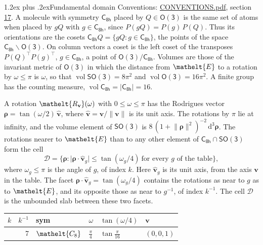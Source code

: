 \documentclass[10pt,a4paper]{article}
\makeatletter
\renewcommand\section{\@startsection{section}{1}{\z@}{-3ex plus -1ex minus -.2ex}%
  {1.2ex plus .2ex}{\normalfont\large\sffamily\bfseries\color{parttitle}}}
\numberwithin{equation}{section}
\newcommand{\eltfont}[1]{{\let\sigma\eltsigma\mathelt{#1}}}
\newcommand{\grp}[1]{\mathsf{#1}}
\newcommand{\cls}[1]{\eltfont{#1}}
\newcommand{\elt}[1]{\eltfont{#1}}
\newcommand{\dirvec}[3]{(#1, #2, #3)}
\newcommand{\unitaxis}{\hat{\mathbf{v}}}
\newcommand{\vv}{\mathbf{v}}
\newcommand{\diff}{\mathrm{d}}
\newcommand{\vol}{\operatorname{vol}}
\newcommand{\rodrigues}{\boldsymbol{\rho}}
\newcommand{\fcell}{\mathcal{D}}
\makeatother
\begin{document}
\section{Fundamental domain}\label{s:fundamental_domain}
Conventions: \href{../../CONVENTIONS.pdf}{CONVENTIONS.pdf}, section \href{../../CONVENTIONS.pdf\#conv.17}{17}.
\leavevmode\label{n:element.placement}A molecule with symmetry $\grp{C_{8h}}$ placed by $Q \in \grp{O(3)}$ is the same set of atoms when placed by $gQ$ with $g \in \grp{C_{8h}}$, since $P(gQ) = P(g)\,P(Q)$. \label{n:operator.cosets}Thus its orientations are the cosets $\grp{C_{8h}}Q = \{gQ : g \in \grp{C_{8h}}\}$, the points of the space $\grp{C_{8h}}\backslash\grp{O(3)}$. On column vectors a coset is the left coset of the transposes $P(Q)^{\top}P(g)^{\top}$, $g \in \grp{C_{8h}}$, a point of $\grp{O(3)}/\grp{C_{8h}}$.
\leavevmode\label{n:operator.volume}Volumes are those of the invariant metric of \href{O3.pdf}{$\grp{O(3)}$} in which the distance from $\elt{E}$ to a rotation by $\omega \le \pi$ is $\omega$, so that $\vol\grp{SO(3)} = 8\pi^2$ and $\vol\grp{O(3)} = 16\pi^2$. A finite group has the counting measure, $\vol\grp{C_{8h}} = |\grp{C_{8h}}| = 16$.

\leavevmode\label{n:vector.rodrigues}\label{n:vector.unitaxis}A rotation $\elt{R_{\vv}}(\omega)$ with $0 \le \omega \le \pi$ has the Rodrigues vector $\rodrigues = \tan(\omega/2)\,\unitaxis$, where $\unitaxis = \vv/\lVert\vv\rVert$ is its unit axis. The rotations by $\pi$ lie at infinity, and the volume element of \href{SO3.pdf}{$\grp{SO(3)}$} is $8\,(1 + \lVert\rodrigues\rVert^2)^{-2}\,\diff^3\rodrigues$.
\leavevmode\label{n:set.cell}The rotations nearer to $\elt{E}$ than to any other element of $\grp{C_{8h}} \cap \grp{SO(3)}$ form the cell
\begin{equation}\label{e:cell}\fcell = \bigl\{\rodrigues : \lvert\rodrigues\cdot\unitaxis_g\rvert \le \tan(\omega_g/4)\ \text{for every $g$ of the table}\bigr\},\end{equation}
where $\omega_g \le \pi$ is the angle of $g$, of index $k$. Here $\unitaxis_g$ is its unit axis, from the axis $\vv$ in the table. The facet $\rodrigues\cdot\unitaxis_g = \tan(\omega_g/4)$ contains the rotations as near to $g$ as to $\elt{E}$, and its opposite those as near to $g^{-1}$, of index $k^{-1}$. The cell $\fcell$ is the unbounded slab between these two facets.
{\small{\renewcommand{\arraystretch}{1.3}\begin{longtable}{@{}rrllll@{}}\toprule
$k$ & $k^{-1}$ & sym & $\omega$ & $\tan(\omega/4)$ & $\vv$\\\midrule\endhead
\bottomrule\endfoot\endlastfoot
1 & 7 & $\cls{C_{8}}$ & $\tfrac{\pi}{4}$ & $\tan\tfrac{\pi}{16}$ & $\dirvec{0}{0}{1}$\\
\bottomrule\end{longtable}}}
\end{document}
